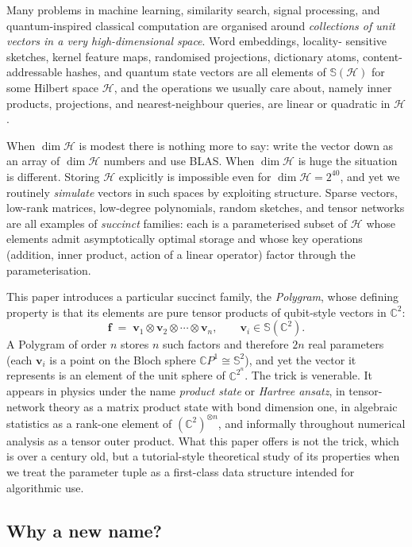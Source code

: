 \documentclass[11pt,letterpaper]{article}
\theoremstyle{definition}
\newcommand{\C}{\mathbb{C}}
\newcommand{\Sphere}{\mathbb{S}}
\newcommand{\Hilb}{\mathcal{H}}
\begin{document}
Many problems in machine learning, similarity search, signal processing, and
quantum-inspired classical computation are organised around \emph{collections of
unit vectors in a very high-dimensional space}. Word embeddings, locality-
sensitive sketches, kernel feature maps, randomised projections, dictionary
atoms, content-addressable hashes, and quantum state vectors are all elements
of $\Sphere(\Hilb)$ for some Hilbert space $\Hilb$, and the operations we
usually care about, namely inner products, projections, and nearest-neighbour
queries, are linear or quadratic in $\Hilb$.

When $\dim\Hilb$ is modest there is nothing more to say: write the vector down
as an array of $\dim\Hilb$ numbers and use BLAS. When $\dim\Hilb$ is huge the
situation is different. Storing $\Hilb$ explicitly is impossible even for
$\dim\Hilb = 2^{40}$, and yet we routinely \emph{simulate} vectors in such
spaces by exploiting structure. Sparse vectors, low-rank matrices, low-degree
polynomials, random sketches, and tensor networks are all examples of
\emph{succinct} families: each is a parameterised subset of $\Hilb$ whose
elements admit asymptotically optimal storage and whose key operations
(addition, inner product, action of a linear operator) factor through the
parameterisation.

This paper introduces a particular succinct family, the \emph{Polygram}, whose
defining property is that its elements are pure tensor products of qubit-style
vectors in $\C^{2}$:
\[
\bm{f} \;=\; \bm{v}_{1} \otimes \bm{v}_{2} \otimes \cdots \otimes \bm{v}_{n},
\qquad \bm{v}_{i} \in \Sphere(\C^{2}).
\]
A Polygram of order $n$ stores $n$ such factors and therefore $2n$ real
parameters (each $\bm{v}_{i}$ is a point on the Bloch sphere $\C P^{1}\cong
\Sphere^{2}$), and yet the vector it represents is an element of the unit sphere
of $\C^{2^{n}}$. The trick is venerable. It appears in physics under the name
\emph{product state} or \emph{Hartree ansatz}, in tensor-network theory as a
matrix product state with bond dimension one, in algebraic statistics as a
rank-one element of $(\C^{2})^{\otimes n}$, and informally throughout numerical
analysis as a tensor outer product. What this paper offers is not the trick,
which is over a century old, but a tutorial-style theoretical study of its
properties when we treat the parameter tuple as a first-class data structure
intended for algorithmic use.

\subsection{Why a new name?}
\end{document}
